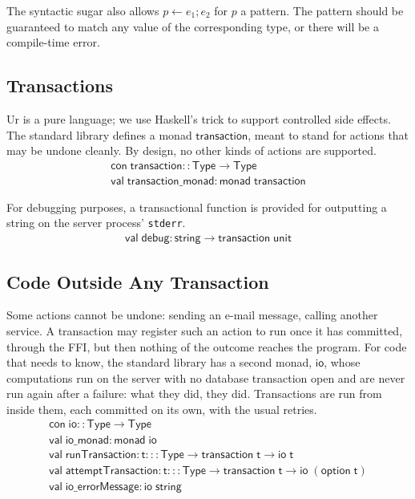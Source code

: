 \documentclass{article}
\newcommand{\mt}[1]{\mathsf{#1}}
\begin{document}
The syntactic sugar also allows $p \leftarrow e_1; e_2$ for $p$ a pattern.  The pattern should be guaranteed to match any value of the corresponding type, or there will be a compile-time error.

\subsection{Transactions}

Ur is a pure language; we use Haskell's trick to support controlled side effects.  The standard library defines a monad $\mt{transaction}$, meant to stand for actions that may be undone cleanly.  By design, no other kinds of actions are supported.
$$\begin{array}{l}
  \mt{con} \; \mt{transaction} :: \mt{Type} \to \mt{Type} \\
  \mt{val} \; \mt{transaction\_monad} : \mt{monad} \; \mt{transaction}
\end{array}$$

For debugging purposes, a transactional function is provided for outputting a string on the server process' \texttt{stderr}.
$$\begin{array}{l}
  \mt{val} \; \mt{debug} : \mt{string} \to \mt{transaction} \; \mt{unit}
\end{array}$$

\subsection{\label{io}Code Outside Any Transaction}

Some actions cannot be undone: sending an e-mail message, calling another service.  A transaction may register such an action to run once it has committed, through the FFI, but then nothing of the outcome reaches the program.  For code that needs to know, the standard library has a second monad, $\mt{io}$, whose computations run on the server with no database transaction open and are never run again after a failure: what they did, they did.  Transactions are run from inside them, each committed on its own, with the usual retries.
$$\begin{array}{l}
  \mt{con} \; \mt{io} :: \mt{Type} \to \mt{Type} \\
  \mt{val} \; \mt{io\_monad} : \mt{monad} \; \mt{io} \\
  \mt{val} \; \mt{runTransaction} : \mt{t} ::: \mt{Type} \to \mt{transaction} \; \mt{t} \to \mt{io} \; \mt{t} \\
  \mt{val} \; \mt{attemptTransaction} : \mt{t} ::: \mt{Type} \to \mt{transaction} \; \mt{t} \to \mt{io} \; (\mt{option} \; \mt{t}) \\
  \mt{val} \; \mt{io\_errorMessage} : \mt{io} \; \mt{string}
\end{array}$$
\end{document}
